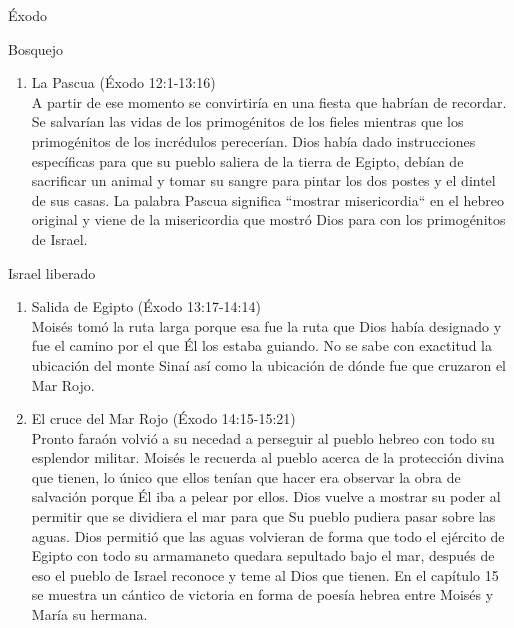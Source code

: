 \begin{section}{Éxodo}
\begin{subsection}{Bosquejo}
\begin{enumerate}
\begin{enumerate}
\begin{itemize}
						\item Úlceras a todo el pueblo\\
							Éxodo 9:9
						\item Lluvia con enormes granizos\\
							Éxodo 9:18
						\item Langostas sobre todos los campos de Egipto\\
							Éxodo 10:4-5
						\item Tinieblas sobre la tierra\\
							Éxodo 10:22
					\end{itemize}
					Para la $10^a$ plaga se tiene la pascua
				\item La Pascua (Éxodo 12:1-13:16)\\
					A partir de ese momento se convirtiría en una fiesta que habrían de recordar. Se salvarían las vidas de los primogénitos de los fieles mientras que los primogénitos de los incrédulos perecerían.\newpage
					Dios había dado instrucciones específicas para que su pueblo saliera de la tierra de Egipto, debían de sacrificar un animal y tomar su sangre para pintar los dos postes y el dintel de sus casas. La palabra Pascua significa ``mostrar misericordia`` en el hebreo original y viene de la misericordia que mostró Dios para con los primogénitos de Israel.
				\end{enumerate}
		\end{enumerate}
	\end{subsection}
	\begin{subsection}{Israel liberado}
		\begin{enumerate}
			\item Salida de Egipto (Éxodo 13:17-14:14)\\
				Moisés tomó la ruta larga porque esa fue la ruta que Dios había designado y fue el camino por el que Él los estaba guiando. No se sabe con exactitud la ubicación del monte Sinaí así como la ubicación de dónde fue que cruzaron el Mar Rojo.
			\item El cruce del Mar Rojo (Éxodo 14:15-15:21)\\
				Pronto faraón volvió a su necedad a perseguir al pueblo hebreo con todo su esplendor militar. Moisés le recuerda al pueblo acerca de la protección divina que tienen, lo único que ellos tenían que hacer era observar la obra de salvación porque Él iba a pelear por ellos. Dios vuelve a mostrar su poder al permitir que se dividiera el mar para que Su pueblo pudiera pasar sobre las aguas. Dios permitió que las aguas volvieran de forma que todo el ejército de Egipto con todo su armamaneto quedara sepultado bajo el mar, después de eso el pueblo de Israel reconoce y teme al Dios que tienen. En el capítulo 15 se muestra un cántico de victoria en forma de poesía hebrea entre Moisés y María su hermana.\\

\end{enumerate}
\end{subsection}
\end{section}
